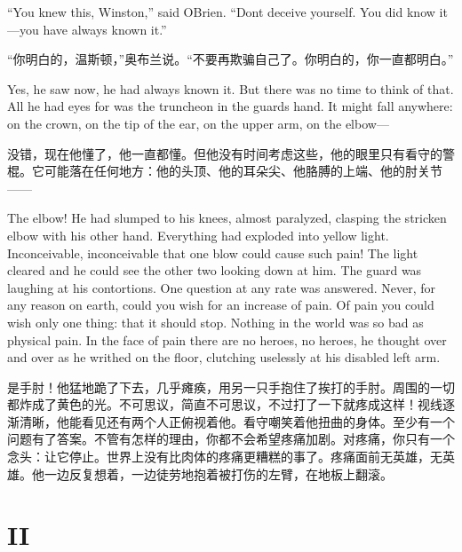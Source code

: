 \begin{paracol}{2}
\switchcolumn*

``You knew this, Winston,'' said O\textquotesingle Brien.
``Don\textquotesingle t deceive yourself. You did know it---you have
always known it.''

\switchcolumn

``你明白的，温斯顿，''奥布兰说。``不要再欺骗自己了。你明白的，你一直都明白。''

\switchcolumn*

Yes, he saw now, he had always known it. But there was no time to think
of that. All he had eyes for was the truncheon in the
guard\textquotesingle s hand. It might fall anywhere: on the crown, on
the tip of the ear, on the upper arm, on the elbow---

\switchcolumn

没错，现在他懂了，他一直都懂。但他没有时间考虑这些，他的眼里只有看守的警棍。它可能落在任何地方：他的头顶、他的耳朵尖、他胳膊的上端、他的肘关节——

\switchcolumn*

The elbow! He had slumped to his knees, almost paralyzed, clasping the
stricken elbow with his other hand. Everything had exploded into yellow
light. Inconceivable, inconceivable that one blow could cause such pain!
The light cleared and he could see the other two looking down at him.
The guard was laughing at his contortions. One question at any rate was
answered. Never, for any reason on earth, could you wish for an increase
of pain. Of pain you could wish only one thing: that it should stop.
Nothing in the world was so bad as physical pain. In the face of pain
there are no heroes, no heroes, he thought over and over as he writhed
on the floor, clutching uselessly at his disabled left arm.

\switchcolumn

是手肘！他猛地跪了下去，几乎瘫痪，用另一只手抱住了挨打的手肘。周围的一切都炸成了黄色的光。不可思议，简直不可思议，不过打了一下就疼成这样！视线逐渐清晰，他能看见还有两个人正俯视着他。看守嘲笑着他扭曲的身体。至少有一个问题有了答案。不管有怎样的理由，你都不会希望疼痛加剧。对疼痛，你只有一个念头：让它停止。世界上没有比肉体的疼痛更糟糕的事了。疼痛面前无英雄，无英雄。他一边反复想着，一边徒劳地抱着被打伤的左臂，在地板上翻滚。

\switchcolumn*


\section{II}\label{ii-2}


\end{paracol}
